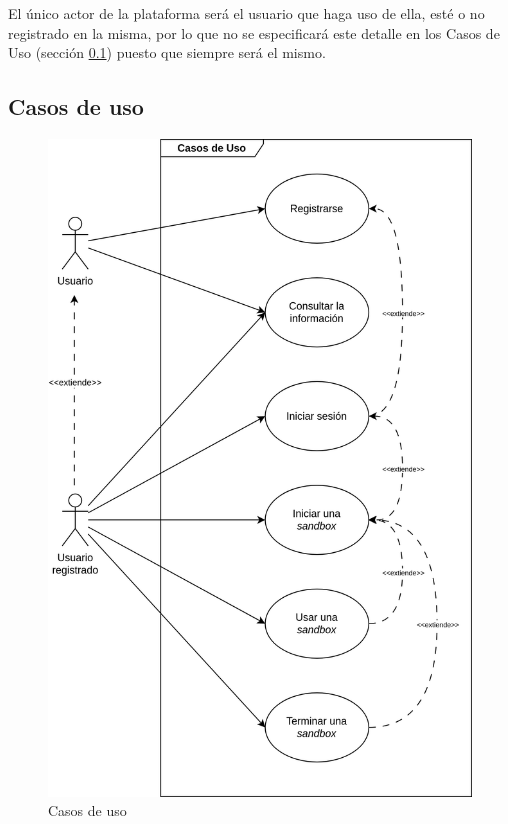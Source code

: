         El único actor de la plataforma será el usuario que haga uso de ella, esté o no registrado en la misma, por lo que no se especificará este detalle en los Casos de Uso (sección \ref{sec:casos-uso}) puesto que siempre será el mismo.
        
        \subsection{Casos de uso}
            \label{sec:casos-uso}
            
            \begin{figure}[h]
                \centering

                \includegraphics[scale=0.125]{images/Diagramas/Casos de uso.png}

                \caption{Casos de uso}
                \label{fig:casos-uso}
            \end{figure}
            
